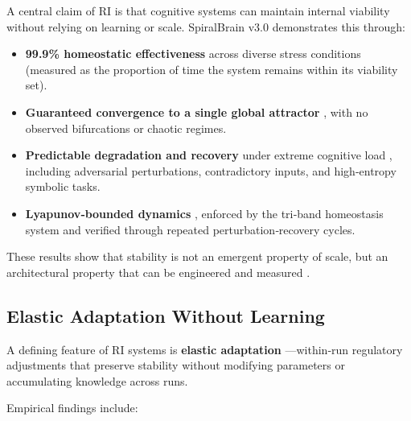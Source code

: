\documentclass[12pt,a4paper]{report}
\begin{document}
A central claim of RI is that cognitive systems can maintain internal viability without relying on learning or scale. SpiralBrain v3.0 demonstrates this through:

\begin{itemize}
\item \textbf{99.9\% homeostatic effectiveness} across diverse stress conditions \cite{SpiralBrainV3} \\
  (measured as the proportion of time the system remains within its viability set).

\item \textbf{Guaranteed convergence to a single global attractor} \cite{SpiralBrainV3}, with no observed bifurcations or chaotic regimes.

\item \textbf{Predictable degradation and recovery} under extreme cognitive load \cite{SpiralBrainV3}, including adversarial perturbations, contradictory inputs, and high‑entropy symbolic tasks.

\item \textbf{Lyapunov‑bounded dynamics} \cite{SpiralBrainV3}, enforced by the tri‑band homeostasis system and verified through repeated perturbation‑recovery cycles.
\end{itemize}

These results show that stability is not an emergent property of scale, but an architectural property that can be engineered and measured \cite{SpiralBrainV3}.

\subsection{Elastic Adaptation Without Learning}

A defining feature of RI systems is \textbf{elastic adaptation} \cite{Cragin2026RI}—within‑run regulatory adjustments that preserve stability without modifying parameters or accumulating knowledge across runs.

Empirical findings include:
\end{document}
